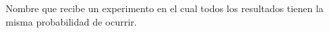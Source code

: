 Nombre que recibe un experimento en el cual todos los resultados tienen la misma probabilidad de ocurrir. 